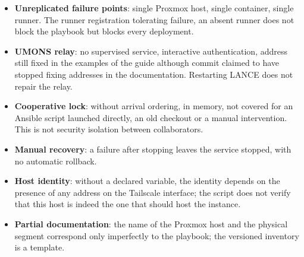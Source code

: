 \begin{itemize}
\item \textbf{Unreplicated failure points}: single Proxmox host, single container,
single runner. The runner registration tolerating failure, an absent runner does
not block the playbook but blocks every deployment.
\item \textbf{UMONS relay}: no supervised service, interactive authentication,
address still fixed in the examples of the guide although commit
 claimed to have stopped fixing addresses in the documentation.
Restarting LANCE does not repair the relay.
\item \textbf{Cooperative lock}: without arrival ordering, in memory, not covered
for an Ansible script launched directly, an old checkout or a manual
intervention. This is not security isolation between collaborators.
\item \textbf{Manual recovery}: a failure after stopping leaves the service
stopped, with no automatic rollback.
\item \textbf{Host identity}: without a declared variable, the identity depends on
the presence of any address on the Tailscale interface; the script does not verify
that this host is indeed the one that should host the instance.
\item \textbf{Partial documentation}: the name of the Proxmox host and the
physical segment correspond only imperfectly to the playbook; the versioned
inventory is a template.
\end{itemize}
